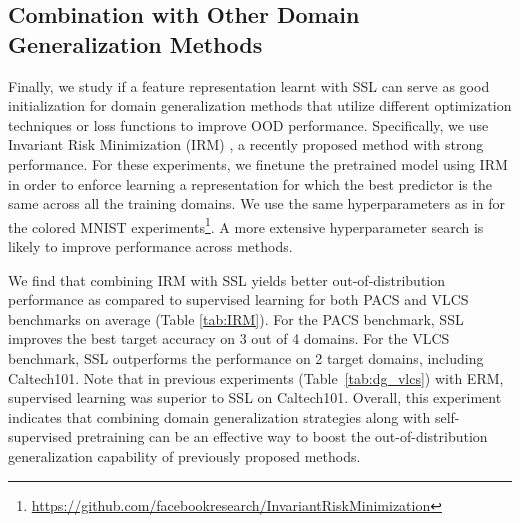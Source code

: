 \documentclass[runningheads]{llncs}
\begin{document}
\subsection{Combination with Other Domain Generalization Methods}
Finally, we study if a feature representation learnt with SSL can serve as good initialization for domain generalization methods that utilize different optimization techniques or loss functions to improve OOD performance. Specifically, we use Invariant Risk Minimization (IRM) \cite{arjovsky2019invariant}, a recently proposed method with strong performance. For these experiments, we finetune the pretrained model using IRM in order to enforce learning a representation for which the best predictor is the same across all the training domains. We use the same hyperparameters as in \cite{arjovsky2019invariant} for the colored MNIST experiments\footnote{\url{https://github.com/facebookresearch/InvariantRiskMinimization}}. A more extensive hyperparameter search is likely to improve performance across methods.

We find that combining IRM with SSL yields better out-of-distribution performance as compared to supervised learning for both PACS and VLCS benchmarks on average (Table \ref{tab:IRM}). For the PACS benchmark, SSL improves the best target accuracy on 3 out of  4  domains. For the VLCS benchmark,  SSL outperforms  the performance on 2 target domains, including Caltech101. Note that in  previous experiments (Table~\ref{tab:dg_vlcs}) with  ERM, supervised learning was superior to SSL on Caltech101. 
Overall, this experiment indicates that combining domain generalization strategies along with self-supervised pretraining can be an effective way to boost the out-of-distribution generalization capability of previously proposed methods.  

\begin{table}[t]
\centering
\caption{Performance of domain generalization with Invariant Risk Minimization (IRM). Self-supervised learning obtains better performance than supervised learning when using IRM for domain generalization. Bolded  value  indicates  best  model  for the target domain.}\vspace{3pt}
\label{tab:IRM}
\end{table}
\end{document}
